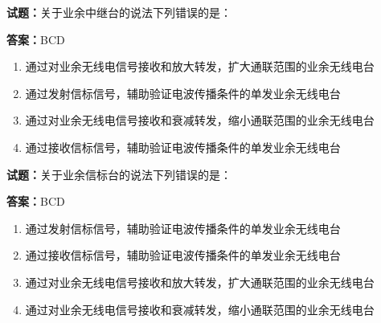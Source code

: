 \documentclass{ctexbook}
\begin{document}




\vspace{1em}

\textbf{试题：}关于业余中继台的说法下列错误的是： 

\textbf{答案：}BCD 

\begin{enumerate}[leftmargin=3em]
  \item 通过对业余无线电信号接收和放大转发，扩大通联范围的业余无线电台 

  \item 通过发射信标信号，辅助验证电波传播条件的单发业余无线电台 

  \item 通过对业余无线电信号接收和衰减转发，缩小通联范围的业余无线电台 

  \item 通过接收信标信号，辅助验证电波传播条件的单发业余无线电台 

\end{enumerate}





\vspace{1em}

\textbf{试题：}关于业余信标台的说法下列错误的是： 

\textbf{答案：}BCD 

\begin{enumerate}[leftmargin=3em]
  \item 通过发射信标信号，辅助验证电波传播条件的单发业余无线电台 

  \item 通过接收信标信号，辅助验证电波传播条件的单发业余无线电台 

  \item 通过对业余无线电信号接收和放大转发，扩大通联范围的业余无线电台 

  \item 通过对业余无线电信号接收和衰减转发，缩小通联范围的业余无线电台 

\end{enumerate}






\vspace{1em}
\end{document}
